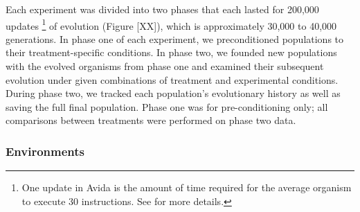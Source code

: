 Each experiment was divided into two phases that each lasted for 200,000 updates \footnote{
    One update in Avida is the amount of time required for the average organism to execute 30 instructions. 
    See \citep{ofria_avida:_2009} for more details.
} of evolution (Figure [XX]), which is approximately 30,000 to 40,000 generations.
In phase one of each experiment, we preconditioned populations to their treatment-specific conditions.
In phase two, we founded new populations with the evolved organisms from phase one and examined their subsequent evolution under given combinations of treatment and experimental conditions.
During phase two, we tracked each population's evolutionary history as well as saving the full final population.
Phase one was for pre-conditioning only; all comparisons between treatments were performed on phase two data. %


\subsubsection{Environments}
\label{sec:methods:experiment:environments}

